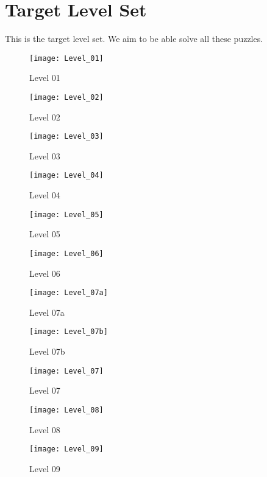 \chapter{Target Level Set}
\label{app:levelset0}
This is the target level set. We aim to be able solve all these puzzles.

\begin{figure}
  \centering \texttt{[image: Level\_01]} \caption{Level
    01} \label{fig:level01-pic} \end{figure}

\begin{figure}
  \centering \texttt{[image: Level\_02]} \caption{Level
    02} \label{fig:level02-pic} \end{figure}
\begin{figure}
  \centering \texttt{[image: Level\_03]} \caption{Level
    03} \label{fig:level03-pic} \end{figure}
\begin{figure}
  \centering \texttt{[image: Level\_04]} \caption{Level
    04} \label{fig:level04-pic} \end{figure}
\begin{figure}
  \centering \texttt{[image: Level\_05]} \caption{Level
    05} \label{fig:level05-pic} \end{figure}
\begin{figure}
  \centering \texttt{[image: Level\_06]} \caption{Level
    06} \label{fig:level06-pic} \end{figure}
\begin{figure}
  \centering \texttt{[image: Level\_07a]} \caption{Level
    07a} \label{fig:level07a-pic} \end{figure}
\begin{figure}
  \centering \texttt{[image: Level\_07b]} \caption{Level
    07b} \label{fig:level07b-pic} \end{figure}
\begin{figure}
  \centering \texttt{[image: Level\_07]} \caption{Level
    07} \label{fig:level07-pic} \end{figure}
\begin{figure}
  \centering \texttt{[image: Level\_08]} \caption{Level
    08} \label{fig:level08-pic} \end{figure}
\begin{figure}
  \centering \texttt{[image: Level\_09]} \caption{Level
    09} \label{fig:level09-pic} \end{figure}
